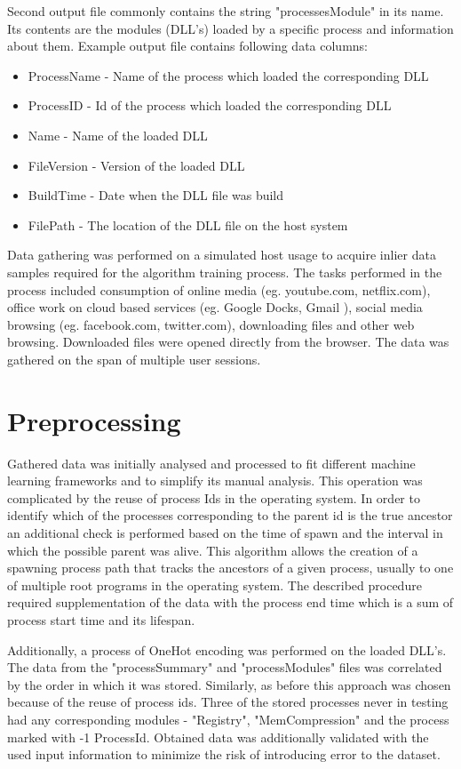 \documentclass[a4paper,twoside,12pt]{book}
\begin{document}
Second output file commonly contains the string "processesModule" in its name. Its contents
are the modules (DLL's) loaded by a specific process and information about them. Example 
output file contains following data columns:
\begin{itemize}
	\item ProcessName - Name of the process which loaded the corresponding DLL
	\item ProcessID - Id of the process which loaded the corresponding DLL
	\item Name - Name of the loaded DLL
	\item FileVersion - Version of the loaded DLL
	\item BuildTime - Date when the DLL file was build
	\item FilePath - The location of the DLL file on the host system
\end{itemize}

Data gathering was performed on a simulated host usage to acquire inlier data samples required 
for the algorithm training process. The tasks performed in the process 
included consumption of online media (eg. youtube.com, netflix.com), office work on cloud 
based services (eg. Google Docks, Gmail ), social media browsing (eg. facebook.com, 
twitter.com), downloading files and other web browsing. Downloaded files were opened 
directly from the browser. The data was gathered on the span of multiple user sessions.

\section{Preprocessing}

Gathered data was initially analysed and processed to fit different machine learning 
frameworks and to simplify its manual analysis. This operation was complicated by the 
reuse of process Ids in the operating system. In order to identify which of the processes 
corresponding to the parent id is the true ancestor an additional check is performed based 
on the time of spawn and the interval in which the possible parent was alive. This algorithm 
allows the creation of a spawning process path that tracks the ancestors of a given process, 
usually to one of multiple root programs in the operating system. The described procedure
required supplementation of the data with the process end time which is a sum of process
start time and its lifespan. 

Additionally, a process of OneHot encoding was performed on the loaded DLL's. The data from 
the "processSummary" and "processModules" files was correlated by the order in which it was 
stored. Similarly, as before this approach was chosen because of the reuse of process ids.
Three of the stored processes never in testing had any corresponding modules - 
"Registry", "MemCompression" and the process marked with -1 ProcessId. Obtained data was
additionally validated with the used input information to minimize the risk of 
introducing error to the dataset.
\end{document}

